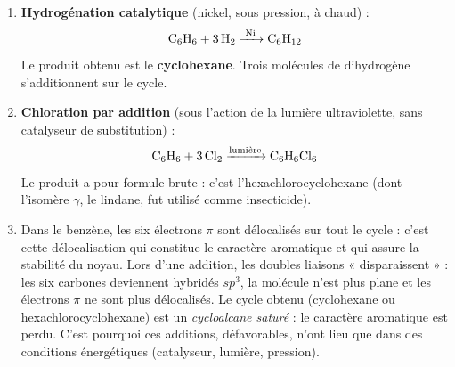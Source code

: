 \documentclass[11pt]{article}
\newcommand{\cle}[1]{{\popxbold\color{popdark}#1}}
\begin{document}
\begin{corrige}
\begin{enumerate}
\item \textbf{Hydrogénation catalytique} (nickel, sous pression, à chaud) :
\[ \ce{C6H6 + 3 H2 ->[Ni] C6H12} \]
Le produit obtenu est le \textbf{cyclohexane}. Trois molécules de dihydrogène s'additionnent sur le cycle.
\item \textbf{Chloration par addition} (sous l'action de la lumière ultraviolette, sans catalyseur de substitution) :
\[ \ce{C6H6 + 3 Cl2 ->[lumi\grave{e}re] C6H6Cl6} \]
Le produit a pour formule brute \textbf{} : c'est l'hexachlorocyclohexane (dont l'isomère $\gamma$, le lindane, fut utilisé comme insecticide).
\item Dans le benzène, les six électrons $\pi$ sont délocalisés sur tout le cycle : c'est cette délocalisation qui constitue le \cle{caractère aromatique} et qui assure la stabilité du noyau. Lors d'une addition, les doubles liaisons « disparaissent » : les six carbones deviennent hybridés $sp^3$, la molécule n'est plus plane et les électrons $\pi$ ne sont plus délocalisés. Le cycle obtenu (cyclohexane ou hexachlorocyclohexane) est un \emph{cycloalcane saturé} : le caractère aromatique est perdu. C'est pourquoi ces additions, défavorables, n'ont lieu que dans des conditions énergétiques (catalyseur, lumière, pression).
\end{enumerate}
\end{corrige}
\end{document}
